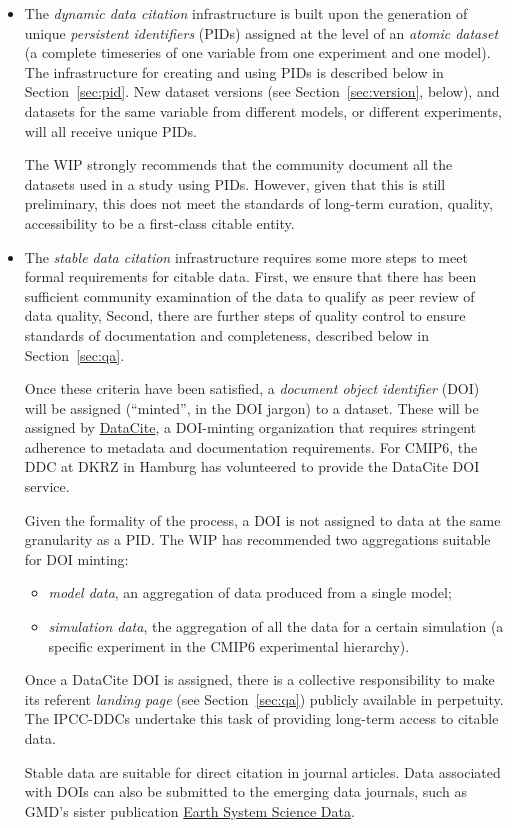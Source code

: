 \documentclass[gmd,manuscript]{copernicus}
\newcommand{\secref}[1] {\mbox{Section  \ref{sec:#1}}}
\begin{document}
\begin{itemize}
\item The \emph{dynamic data citation} infrastructure is built upon
  the generation of unique \emph{persistent identifiers} (PIDs)
  assigned at the level of an \emph{atomic dataset} (a complete
  timeseries of one variable from one experiment and one model). The
  infrastructure for creating and using PIDs is described below in
  \secref{pid}. New dataset versions (see \secref{version}, below),
  and datasets for the same variable from different models, or
  different experiments, will all receive unique PIDs.

  The WIP strongly recommends that the community document all the
  datasets used in a study using PIDs. However, given that this is
  still preliminary, this does not meet the standards of long-term
  curation, quality, accessibility to be a first-class citable entity.
\item The \emph{stable data citation} infrastructure requires some
  more steps to meet formal requirements for citable data. First, we
  ensure that there has been sufficient community examination of the
  data to qualify as peer review of data quality, Second, there are
  further steps of quality control to ensure standards of
  documentation and completeness, described below in \secref{qa}.

  Once these criteria have been satisfied, a \emph{document object
    identifier} (DOI) will be assigned (``minted'', in the DOI jargon)
  to a dataset. These will be assigned by
  \href{https://www.datacite.org/dois.html}{DataCite}, a DOI-minting
  organization that requires stringent adherence to metadata and
  documentation requirements. For CMIP6, the DDC at DKRZ in Hamburg
  has volunteered to provide the DataCite DOI service.

  Given the formality of the process, a DOI is not assigned to data at
  the same granularity as a PID. The WIP has recommended two
  aggregations suitable for DOI minting:

  \begin{itemize}
  \item \emph{model data}, an aggregation of data produced from a
    single model;
  \item \emph{simulation data}, the aggregation of all the data for a
    certain simulation (a specific experiment in the CMIP6
    experimental hierarchy).
  \end{itemize}

  Once a DataCite DOI is assigned, there is a collective
  responsibility to make its referent \emph{landing page} (see
  \secref{qa}) publicly available in perpetuity. The IPCC-DDCs
  undertake this task of providing long-term access to citable data.

  Stable data are suitable for direct citation in journal articles.
  Data associated with DOIs can also be submitted to the emerging data
  journals, such as GMD's sister publication
  \href{https://www.earth-system-science-data.net/}{Earth System
    Science Data}.
\end{itemize}
\end{document}
